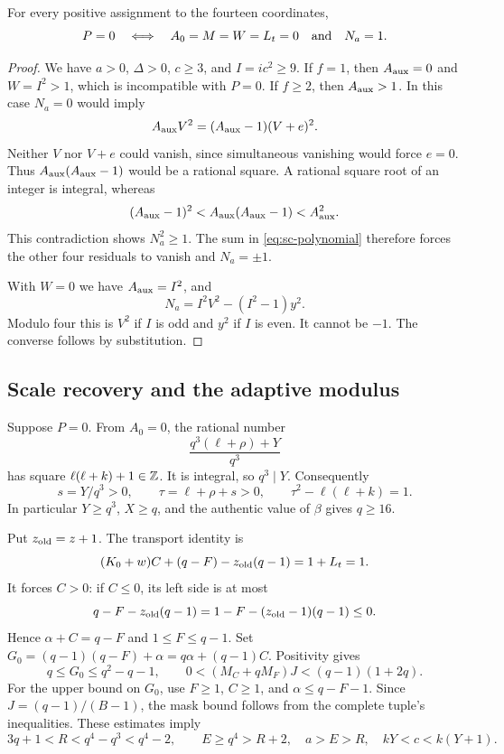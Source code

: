 \begin{lemma}\label{lem:sc-minimum}
For every positive assignment to the fourteen coordinates,
\[
 P=0\quad\Longleftrightarrow\quad
 A_0=M=W=L_t=0\quad\hbox{and}\quad N_a=1.
\]
\end{lemma}
\begin{proof}
We have $a>0$, $\Delta>0$, $c\ge3$, and $I=ic^2\ge9$.
If $f=1$, then $A_{\rm aux}=0$ and $W=I^2>1$, which is incompatible
with $P=0$.  If $f\ge2$, then $A_{\rm aux}>1$.  In this case $N_a=0$
would imply
\[
 A_{\rm aux}V^2=(A_{\rm aux}-1)(V+e)^2.
\]
Neither $V$ nor $V+e$ could vanish, since simultaneous vanishing would
force $e=0$.  Thus $A_{\rm aux}(A_{\rm aux}-1)$ would be a rational
square.  A rational square root of an integer is integral, whereas
\[
 (A_{\rm aux}-1)^2
 <A_{\rm aux}(A_{\rm aux}-1)<A_{\rm aux}^2.
\]
This contradiction shows $N_a^2\ge1$.  The sum in
\eqref{eq:sc-polynomial} therefore forces the other four residuals to
vanish and $N_a=\pm1$.

With $W=0$ we have $A_{\rm aux}=I^2$, and
\[
 N_a=I^2V^2-(I^2-1)y^2.
\]
Modulo four this is $V^2$ if $I$ is odd and $y^2$ if $I$ is even.
It cannot be $-1$.  The converse follows by substitution.
\end{proof}

\subsection{Scale recovery and the adaptive modulus}

Suppose $P=0$.  From $A_0=0$, the rational number
\[
 \frac{q^3(\ell+\rho)+Y}{q^3}
\]
has square $\ell(\ell+k)+1\in\mathbb Z$.  It is integral, so $q^3\mid Y$.
Consequently
\begin{equation}\label{eq:sc-scale}
 s=Y/q^3>0,\qquad
 \tau=\ell+\rho+s>0,\qquad
 \tau^2-\ell(\ell+k)=1.
\end{equation}
In particular $Y\ge q^3$, $X\ge q$, and the authentic value of $\beta$
gives $q\ge16$.

Put $z_{\rm old}=z+1$.  The transport identity is
\[
 (K_0+w)C+(q-F)-z_{\rm old}(q-1)=1+L_t=1.
\]
It forces $C>0$: if $C\le0$, its left side is at most
\[
 q-F-z_{\rm old}(q-1)
   =1-F-(z_{\rm old}-1)(q-1)\le0.
\]
Hence $\alpha+C=q-F$ and $1\le F\le q-1$.  Set
$G_0=(q-1)(q-F)+\alpha=q\alpha+(q-1)C$.  Positivity gives
\[
 q\le G_0\le q^2-q-1,\qquad
 0<(M_C+qM_F)J<(q-1)(1+2q).
\]
For the upper bound on $G_0$, use $F\ge1$, $C\ge1$, and
$\alpha\le q-F-1$.  Since $J=(q-1)/(B-1)$, the mask bound follows from
the complete tuple's inequalities.  These estimates imply
\begin{equation}\label{eq:sc-bounds}
 3q+1<R<q^4-q^3<q^4-2,
 \qquad E\ge q^4>R+2,\quad a>E>R,
 \quad kY<c<k(Y+1).
\end{equation}

